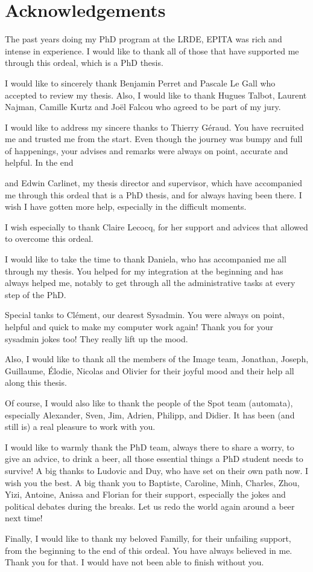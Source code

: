 \section*{Acknowledgements}
\label{sec:acknowledgement}

The past years doing my PhD program at the LRDE, EPITA was rich and intense in experience. I would like to thank all of
those that have supported me through this ordeal, which is a PhD thesis.

I would like to sincerely thank Benjamin Perret and Pascale Le Gall who accepted to review my thesis. Also, I would like
to thank Hugues Talbot, Laurent Najman, Camille Kurtz and Jo\"{e}l Falcou who agreed to be part of my jury.

I would like to address my sincere thanks to Thierry Géraud. You have recruited me and trusted me from the start. Even
though the journey was bumpy and full of happenings, your advises and remarks were always on point, accurate and
helpful. In the end


and Edwin Carlinet, my thesis director and supervisor, which
have accompanied me through this ordeal that is a PhD thesis, and for always having been there. I wish I have gotten
more help, especially in the difficult moments.

I wish especially to thank Claire Lecocq, for her support and advices that allowed to overcome this ordeal.

I would like to take the time to thank Daniela, who has accompanied me all through my thesis. You helped for my
integration at the beginning and has always helped me, notably to get through all the administrative tasks at every
step of the PhD.

Special tanks to Cl\'{e}ment, our dearest Sysadmin. You were always on point, helpful and quick to make my computer work
again! Thank you for your sysadmin jokes too! They really lift up the mood.

Also, I would like to thank all the members of the Image team, Jonathan, Joseph, Guillaume, \'{E}lodie, Nicolas and
Olivier for their joyful mood and their help all along this thesis.

Of course, I would also like to thank the people of the Spot team (automata), especially Alexander, Sven, Jim, Adrien,
Philipp, and Didier. It has been (and still is) a real pleasure to work with you.

I would like to warmly thank the PhD team, always there to share a worry, to give an advice, to drink a beer, all those
essential things a PhD student needs to survive! A big thanks to Ludovic and Duy, who have set on their own path now. I
wish you the best. A big thank you to Baptiste, Caroline, Minh, Charles, Zhou, Yizi, Antoine, Anissa and Florian for
their support, especially the jokes and political debates during the breaks. Let us redo the world again around a beer
next time!

Finally, I would like to thank my beloved Familly, for their unfailing support, from the beginning to the end of this
ordeal. You have always believed in me. Thank you for that. I would have not been able to finish without you.
